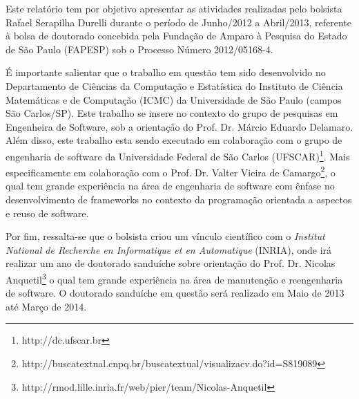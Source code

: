  Este relatório tem por objetivo apresentar as atividades realizadas pelo bolsista Rafael Serapilha Durelli durante o período de Junho/2012 a Abril/2013,
 referente à bolsa de doutorado concebida pela Fundação de Amparo à Pesquisa do Estado de São Paulo (FAPESP) sob o Processo Número 2012/05168-4. 
 
 É importante salientar que o trabalho em questão tem sido desenvolvido no Departamento de Ciências da Computação e Estatística do Instituto de Ciência 
 Matemáticas e de Computação (ICMC) da Universidade de São Paulo (campos São Carlos/SP).  
 Este trabalho se insere no contexto do grupo de pesquisas em Engenheira de Software, sob a orientação do Prof. Dr. Márcio Eduardo Delamaro.  
 Além disso, este trabalho esta sendo executado em colaboração com o grupo de engenharia de software da Universidade Federal de São Carlos (UFSCAR)\footnote{http://dc.ufscar.br}.  
 Mais especificamente em colaboração com o Prof. Dr. Valter Vieira de Camargo\footnote{http://buscatextual.cnpq.br/buscatextual/visualizacv.do?id=S819089},
 o qual tem grande experiência na área de engenharia de software com ênfase no desenvolvimento de frameworks no contexto da programação orientada a aspectos e reuso de software. 

Por fim, ressalta-se que o bolsista criou um vínculo científico com o \textit{Institut National de Recherche en Informatique et en Automatique} (INRIA),  
onde irá realizar um ano de doutorado sanduíche sobre orientação do  
 Prof. Dr. Nicolas Anquetil\footnote{http://rmod.lille.inria.fr/web/pier/team/Nicolas-Anquetil} o qual tem grande experiência na área de manutenção e reengenharia de software. O doutorado sanduíche em questão será realizado em Maio de 2013 até Março de 2014.